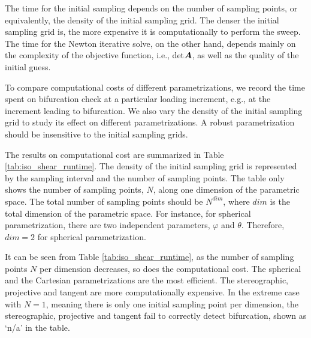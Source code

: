\documentclass[12pt]{article}
\numberwithin{equation}{section}
\begin{document}
The time for the initial sampling depends on the number of sampling 
points, or equivalently, the density of the initial sampling grid. The 
denser the initial sampling grid is, the more expensive it is 
computationally to perform the sweep. The time for the Newton 
iterative solve, on the other hand, depends mainly on the complexity 
of the objective function, i.e., det${\boldsymbol{A}}$, as well as the quality of 
the initial guess.

To compare computational costs of different parametrizations, we 
record the time spent on bifurcation check at a particular loading 
increment, e.g., at the increment leading to bifurcation. We also vary 
the density of the initial sampling grid to study its effect on 
different parametrizations. A robust parametrization should be 
insensitive to the initial sampling grids.

The results on computational cost are summarized in Table~
\ref{tab:iso_shear_runtime}. The density of the initial sampling grid 
is represented by the sampling interval and the number of sampling 
points. The table only shows the number of sampling points, $N$, along 
one dimension of the parametric space. The total number of sampling 
points should be $N^{dim}$, where $dim$ is the total dimension of 
the parametric space. For instance, for spherical parametrization, 
there are two independent parameters, $\varphi$ and $\theta$. 
Therefore, $dim=2$ for spherical parametrization.

It can be seen from Table \ref{tab:iso_shear_runtime}, as the number 
of sampling points $N$ per dimension decreases, so does the 
computational cost. The spherical and the Cartesian parametrizations 
are the most efficient. The stereographic, projective and tangent are 
more computationally expensive. In the extreme case with $N=1$, 
meaning there is only one initial sampling point per dimension, the 
stereographic, projective and tangent fail to correctly detect 
bifurcation, shown as `n/a' in the table. 
\end{document}
